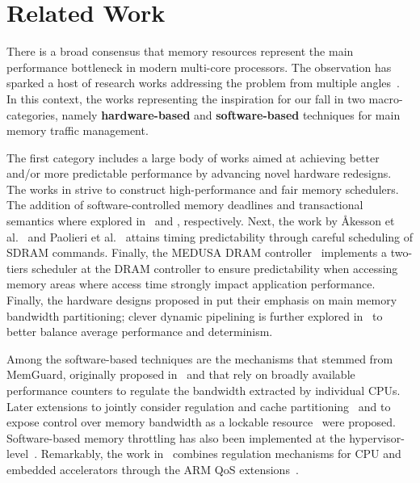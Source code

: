 \section{Related Work}
There is a broad consensus that memory resources represent the main
performance bottleneck in modern multi-core processors. The
observation has sparked a host of research works addressing the
problem from multiple angles~\cite{temp_reg_survey}. In this context,
the works representing the inspiration for our \schim fall in two
macro-categories, namely \textbf{hardware-based} and
\textbf{software-based} techniques for main memory traffic management.

The first category includes a large body of works aimed at achieving
better and/or more predictable performance by advancing novel hardware
redesigns. The works in \cite{mutlu2007stall, mutlu2008parallelism,
  nesbit2006fair} strive to construct high-performance and fair memory
schedulers. The addition of software-controlled memory deadlines and
transactional semantics where explored in~\cite{usui2016dash} and
\cite{ferri2011soc}, respectively. Next, the work by Åkesson et
al.~\cite{akesson2007predator, akesson2010predictable} and Paolieri et
al.~\cite{paolieri2009analyzable} attains timing predictability
through careful scheduling of SDRAM commands. Finally, the MEDUSA DRAM
controller~\cite{valsan2015medusa, detmem2018} implements a two-tiers
scheduler at the DRAM controller to ensure predictability when
accessing memory areas where access time strongly impact application
performance. Finally, the hardware designs proposed in
\cite{zhou2016mitts, rafique2007effective, Farshchi2020BRUBR} put
their emphasis on main memory bandwidth partitioning; clever dynamic
pipelining is further explored in~\cite{drambulism2020rtas} to better
balance average performance and determinism.

Among the software-based techniques are the mechanisms that stemmed
from MemGuard, originally proposed in~\cite{memguard2013} and that
rely on broadly available performance counters to regulate the
bandwidth extracted by individual CPUs. Later extensions to jointly
consider regulation and cache partitioning~\cite{holistic2019rtas} and
to expose control over memory bandwidth as a lockable
resource~\cite{bwlockyun2017} were proposed. Software-based memory
throttling has also been implemented at the
hypervisor-level~\cite{xvisor2018, ewarp2020rtss}. Remarkably, the
work in~\cite{ewarp2020rtss} combines regulation mechanisms for CPU
and embedded accelerators through the ARM QoS
extensions~\cite{qos-400}.

